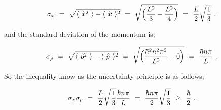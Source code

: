 \documentclass{article}
\begin{document}
\begin{equation} \label{eq:254}
\sigma_{x} \hspace{0.125cm} = \hspace{0.125cm} \sqrt{\langle \hspace{0.125cm} \hat{x}^{2} \hspace{0.125cm} \rangle - \langle \hspace{0.125cm} \hat{x} \hspace{0.125cm} \rangle^{2}} \hspace{0.125cm} = \hspace{0.125cm} \sqrt{\Big( \frac{L^2}{3} - \frac{L^2}{4} \Big)} \hspace{0.125cm} = \hspace{0.125cm} \frac{L}{2} \sqrt{\frac{1}{3}}  \hspace{0.125cm} .
\end{equation}

and the standard deviation of the momentum is;

\begin{equation} \label{eq:254}
\sigma_{p} \hspace{0.125cm} = \hspace{0.125cm} \sqrt{\langle \hspace{0.125cm} \hat{p}^{2} \hspace{0.125cm} \rangle - \langle \hspace{0.125cm} \hat{p} \hspace{0.125cm} \rangle^{2}} \hspace{0.125cm} = \hspace{0.125cm} \sqrt{\Big( \frac{\hbar^{2} n^2 \pi^2}{L^2} - 0 \Big)} \hspace{0.125cm} = \hspace{0.125cm} \frac{\hbar n \pi}{L}  \hspace{0.125cm} .
\end{equation}

So the inequality know as the uncertainty principle is as follows;

\begin{equation} \label{eq:254}
\sigma_{x} \sigma_{p} \hspace{0.125cm} = \hspace{0.125cm} \frac{L}{2} \sqrt{\frac{1}{3}} \frac{\hbar n \pi}{L} \hspace{0.125cm} = \hspace{0.125cm} \frac{\hbar n \pi}{2} \sqrt{\frac{1}{3}} \hspace{0.125cm} \geq \hspace{0.125cm} \frac{ \hbar }{2} \hspace{0.125cm} .
\end{equation}
\end{document}
